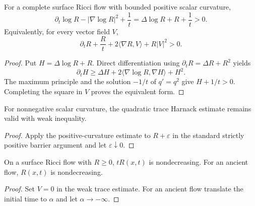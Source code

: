 \begin{proposition}
\label{prop:chow-ii-surface-trace-harnack-positive-curvature}
For a complete surface Ricci flow with bounded positive scalar curvature,
\[
\partial_t\log R-|\nabla\log R|^2+\frac1t
=\Delta\log R+R+\frac1t>0.
\]
Equivalently, for every vector field \(V\),
\[
\partial_tR+\frac Rt+2\langle\nabla R,V\rangle+R|V|^2>0.
\]
\end{proposition}
\begin{proof}
\sketch Put \(H=\Delta\log R+R\).  Direct differentiation using
\(\partial_tR=\Delta R+R^2\) yields
\[
\partial_tH\ge\Delta H+2\langle\nabla\log R,\nabla H\rangle+H^2.
\]
The maximum principle and the solution \(-1/t\) of \(q'=q^2\) give
\(H+1/t>0\).  Completing the square in \(V\) proves the equivalent form.
\end{proof}

\begin{remark}
\label{rem:chow-ii-surface-trace-harnack-nonnegative-curvature}
For nonnegative scalar curvature, the quadratic trace Harnack estimate remains
valid with weak inequality.
\end{remark}
\begin{proof}
\sketch Apply the positive-curvature estimate to \(R+\varepsilon\) in the standard
strictly positive barrier argument and let \(\varepsilon\downarrow0\).
\end{proof}

\begin{corollary}
\label{cor:chow-ii-surface-tr-monotonicity}
On a surface Ricci flow with \(R\ge0\), \(tR(x,t)\) is nondecreasing.  For an
ancient flow, \(R(x,t)\) is nondecreasing.
\end{corollary}
\begin{proof}
\sketch Set \(V=0\) in the weak trace estimate.  For an ancient flow translate the
initial time to \(\alpha\) and let \(\alpha\to-\infty\).
\end{proof}

